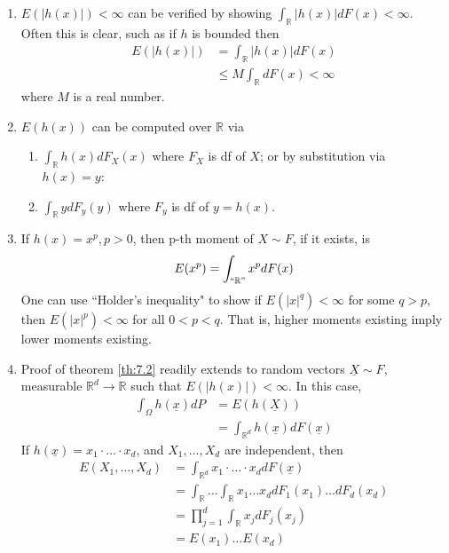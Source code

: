 \documentclass{article}
\newcommand{\R}{\mathbb{R}}
\begin{document}
		\begin{myrem}{}{}
			\begin{enumerate}
				\item $E(|h(x)|)<\infty$ can be verified by showing $\int_{\R}|h(x)|dF(x)<\infty$. Often this is clear, such as if $h$ is bounded then
				\begin{align*}
					E(|h(x)|)&=\int_{\R}|h(x)|dF(x)\\
					&\leq M\int_{\R}dF(x)<\infty
				\end{align*}
				where $M$ is a real number.
				
				\item $E(h(x))$ can be computed over $\R$ via
				\begin{enumerate}[label=(\roman*)]
					\item $\int_{\R}h(x)dF_X(x)$ where $F_X$ is df of $X$; or by substitution via $h(x)=y$:
					
					\item $\int_{\R}ydF_y(y)$ where $F_y$ is df of $y=h(x)$.
				\end{enumerate}
				
				\item If $h(x)=x^p, p>0$, then p-th moment of $X\sim F$, if it exists, is $$E(x^p)=\int_{``\R"}x^pdF(x)$$
				One can use ``Holder's inequality" to show if $E(|x|^q)<\infty$ for some $q>p$, then $E(|x|^p)<\infty$ for all $0<p<q$. That is, higher moments existing imply lower moments existing.
				
				\item Proof of theorem \ref{th:7.2} readily extends to random vectors $\underline{X}\sim F$, measurable $\R^d\to\R$ such that $E(|h(x)|)<\infty$. In this case,
				\begin{align*}
					\int_{\Omega}h(\underline{x})dP&=E(h(\underline{X}))\\
					&=\int_{\R^d}h(\underline{x})dF(\underline{x})
				\end{align*}
				If $h(\underline{x})=x_1\cdot\dots\cdot x_d$, and $X_1, \dots, X_d$ are independent, then
				\begin{align*}
					E(X_1, \dots, X_d)&=\int_{\R^d}x_1\cdot\dots\cdot x_ddF(\underline{x})\\
					&=\int_{\R}\dots\int_{\R}x_1\dots x_ddF_1(x_1)\dots dF_d(x_d)\\
					&=\prod_{j=1}^{d}\int_{\R}x_jdF_j(x_j)\\
					&=E(x_1)\dots E(x_d)
				\end{align*}
			\end{enumerate}
		\end{myrem}
		
\end{document}
